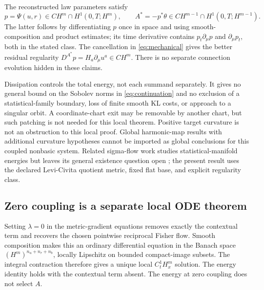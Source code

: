 \documentclass[11pt]{article}
\begin{document}
The reconstructed law parameters satisfy
\begin{equation}
 p=\Psi(u,r)\in CH^m\cap H^1(0,T;H^m),\qquad
 A^*=-p^*\theta\in CH^{m-1}\cap H^1(0,T;H^{m-1}).
 \label{eq:reconstruction}
\end{equation}
The latter follows by differentiating $p$ once in space and using smooth-composition and product estimates; its time derivative contains $p_t\partial_\mu p$ and $\partial_\mu p_t$, both in the stated class. The cancellation in \eqref{eq:mechanical} gives the better residual regularity
$D^{A^*}p=H_a\partial_\mu u^a\in CH^m$.
There is no separate connection evolution hidden in these claims.

Dissipation controls the total energy, not each summand separately. It gives no general bound on the Sobolev norms in \eqref{eq:continuation} and no exclusion of a statistical-family boundary, loss of finite smooth KL costs, or approach to a singular orbit. A coordinate-chart exit may be removable by another chart, but such patching is not needed for this local theorem. Positive target curvature is not an obstruction to this local proof. Global harmonic-map results with additional curvature hypotheses \cite{Eells1964} cannot be imported as global conclusions for this coupled nonbasic system. Related sigma-flow work studies statistical-manifold energies but leaves its general existence question open \cite{Cassel2024}; the present result uses the declared Levi-Civita quotient metric, fixed flat base, and explicit regularity class.

\subsection{Zero coupling is a separate local ODE theorem}

Setting $\lambda=0$ in the metric-gradient equations removes exactly the contextual term and recovers the chosen pointwise reciprocal Fisher flow. Smooth composition makes this an ordinary differential equation in the Banach space $(H^m)^{n_u+n_r+n_b}$, locally Lipschitz on bounded compact-image subsets. The integral contraction therefore gives a unique local $C^1_tH^m_x$ solution. The energy identity holds with the contextual term absent. The energy at zero coupling does not select $A$.
\end{document}
